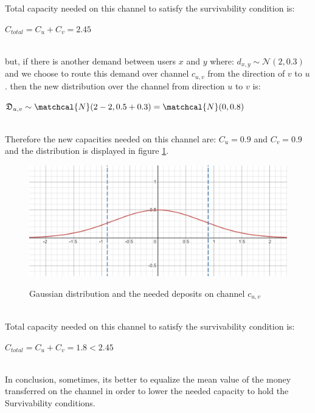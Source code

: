 \documentclass{cup-ino}
\begin{document}
Total capacity needed on this channel to satisfy the survivability condition is:
\begin{center}
    $C_{total} = C_u + C_v = 2.45$
\end{center}
\\
but, if there is another demand between users $x$ and $y$ where: $d_{x,y} \sim \mathcal{N}(2, 0.3)$ and we choose to route this demand over channel $c_{u,v}$ from the direction of $v$ to $u$. then the new distribution over the channel from direction $u$ to $v$ is: 
\begin{center}
 $\mathfrak{D}_{u,v}  \sim \matchcal{N}(2-2, 0.5+0.3) = \matchcal{N}(0, 0.8) $
\end{center}
\\
Therefore the new capacities needed on this channel are:
$C_u = 0.9$ and $C_v=0.9$ and the distribution is displayed in figure \ref{fig:dist2}.
\begin{figure}[h]
\caption{Gaussian distribution and the needed deposits on channel $c_{u,v}$}
\centering
\includegraphics[scale=0.3]{Gauss_dist_2.jpeg}
\label{fig:dist2}
\end{figure}
\\
Total capacity needed on this channel to satisfy the survivability condition is:
\begin{center}
    $C_{total} = C_u + C_v = 1.8 < 2.45$
\end{center}
\\
In conclusion, sometimes, its better to equalize the mean value of the money transferred on the channel in order to lower the needed capacity to hold the Survivability conditions.\\
\\\\

\printbibliography
\end{document}

